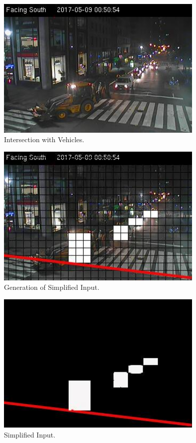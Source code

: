 \documentclass[a4paper,12pt]{report}
\begin{document}
				
				\begin{figure}[H]
					\begin{centering}
						\includegraphics[width=10cm]{images/traffic2.png}
						\caption{Intersection with Vehicles.}
					\end{centering}
				\end{figure}

				
				\begin{figure}[H]
					\begin{centering}
						\includegraphics[width=10cm]{images/traffic3.png}
						\caption{Generation of Simplified Input.}
					\end{centering}
				\end{figure}

				
				\begin{figure}[H]
					\begin{centering}
						\includegraphics[width=10cm]{images/traffic4.png}
						\caption{Simplified Input.}
					\end{centering}
				\end{figure}
\end{document}
